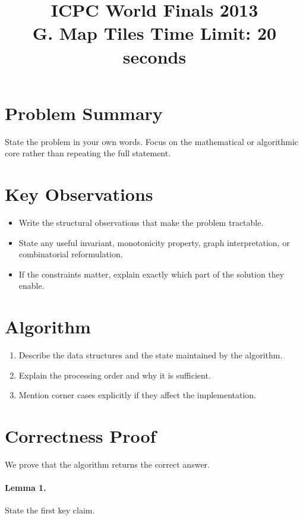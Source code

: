 \documentclass[11pt]{article}
\title{ICPC World Finals 2013\\G. Map Tiles Time Limit: 20 seconds}
\author{}
\date{}
\begin{document}
\maketitle

\section*{Problem Summary}

State the problem in your own words. Focus on the mathematical or algorithmic core rather than repeating the full statement.

\section*{Key Observations}

\begin{itemize}[leftmargin=*]
    \item Write the structural observations that make the problem tractable.
    \item State any useful invariant, monotonicity property, graph interpretation, or combinatorial reformulation.
    \item If the constraints matter, explain exactly which part of the solution they enable.
\end{itemize}

\section*{Algorithm}

\begin{enumerate}[leftmargin=*]
    \item Describe the data structures and the state maintained by the algorithm.
    \item Explain the processing order and why it is sufficient.
    \item Mention corner cases explicitly if they affect the implementation.
\end{enumerate}

\section*{Correctness Proof}

We prove that the algorithm returns the correct answer.

\paragraph{Lemma 1.}
State the first key claim.
\end{document}
